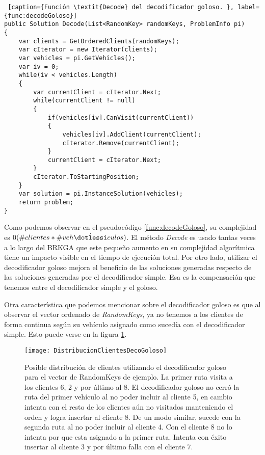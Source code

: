 \bigskip

\begin{minipage}{\linewidth}
\begin{lstlisting} [caption={Función \textit{Decode} del decodificador goloso. }, label={func:decodeGoloso}]
public Solution Decode(List<RandomKey> randomKeys, ProblemInfo pi)
{
	var clients = GetOrderedClients(randomKeys);
	var cIterator = new Iterator(clients);
	var vehicles = pi.GetVehicles();	
	var iv = 0;
	while(iv < vehicles.Length)
	{
		var currentClient = cIterator.Next;
		while(currentClient != null)
		{
			if(vehicles[iv].CanVisit(currentClient))
			{
				vehicles[iv].AddClient(currentClient);
				cIterator.Remove(currentClient);
			}
			currentClient = cIterator.Next;
		}
		cIterator.ToStartingPosition;
	}
	var solution = pi.InstanceSolution(vehicles);
	return problem;
}
\end{lstlisting}
\end{minipage}

\bigskip

Como podemos observar en el pseudocódigo \ref{func:decodeGoloso}, su complejidad es $0(\#clientes * \#veh\acute{\dotlessi}culos)$. El método \textit{Decode} es usado tantas veces a lo largo del BRKGA que este pequeño aumento en su complejidad algorítmica tiene un impacto visible en el tiempo de ejecución total. Por otro lado, utilizar el decodificador goloso mejora el beneficio de las soluciones generadas respecto de las soluciones generadas por el decodificador simple. Esa es la compensación que tenemos entre el decodificador simple y el goloso.

\bigskip

Otra característica que podemos mencionar sobre el decodificador goloso es que al observar el vector ordenado de \textit{RandomKeys}, ya no tenemos a los clientes de forma continua según su vehículo asignado como sucedía con el decodificador simple. Esto puede verse en la figura \ref{fig:DistribucionClientesDecoGoloso}.

\begin{figure}[h]
	\caption{Posible distribución de clientes utilizando el decodificador goloso para el vector de RandomKeys de ejemplo. La primer ruta visita a los clientes 6, 2 y por último al 8. El decodificador goloso no cerró la ruta del primer vehículo al no poder incluir al cliente 5, en cambio intenta con el resto de los clientes aún no visitados manteniendo el orden y logra insertar al cliente 8. De un modo similar, sucede con la segunda ruta al no poder incluir al cliente 4. Con el cliente 8 no lo intenta por que esta asignado a la primer ruta. Intenta con éxito insertar al cliente 3 y por último falla con el cliente 7. }
	\centering
	\texttt{[image: DistribucionClientesDecoGoloso]}
	\label{fig:DistribucionClientesDecoGoloso}
\end{figure}

